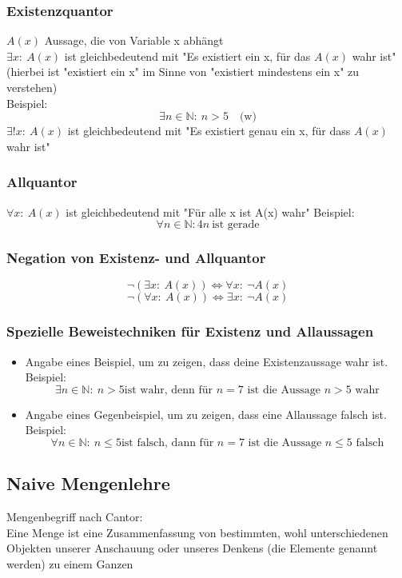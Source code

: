 \documentclass[a4paper]{scrartcl}
\DeclareMathOperator{\Forall}{\forall}
\theoremstyle{definition}
\theoremstyle{plain}
\theoremstyle{plain}
\theoremstyle{remark}
\theoremstyle{remark}
\theoremstyle{remark}
\theoremstyle{remark}
\theoremstyle{remark}
\begin{document}
\subsubsection{Existenzquantor}
\label{sec-2-3-1}
$A(x)$ Aussage, die von Variable x abhängt \\
        $\exists x:~A(x)$ ist gleichbedeutend mit "Es existiert ein x, für das $A(x)$ wahr ist" (hierbei ist "existiert ein x" im Sinne von "existiert mindestens ein x" zu verstehen) \\
        Beispiel:
\[\exists n\in\mathbb{N}:~n>5\quad\text{(w)}\]
$\exists !x:~A(x)$ ist gleichbedeutend mit "Es existiert genau ein x, für dass $A(x)$ wahr ist"
\subsubsection{Allquantor}
\label{sec-2-3-2}
$\Forall x:~A(x)$ ist gleichbedeutend mit "Für alle x ist A(x) wahr"
Beispiel:
\[\Forall n\in\mathbb{N}: 4n~\text{ist gerade}\]
\subsubsection{Negation von Existenz- und Allquantor}
\label{sec-2-3-3}
\[\neg(\exists x:~A(x)) \iff \Forall x:~\neg A(x)\]
\[\neg(\Forall x:~A(x)) \iff \exists x:~\neg A(x)\]
\subsubsection{Spezielle Beweistechniken für Existenz und Allaussagen}
\label{sec-2-3-4}
\begin{itemize}
\item Angabe eines Beispiel, um zu zeigen, dass deine Existenzaussage wahr ist. \\
          Beispiel:
\[\exists n\in\mathbb{N}:~n>5 \text{ist wahr, denn für $n = 7$ ist die Aussage $n > 5$ wahr}\]
\item Angabe eines Gegenbeispiel, um zu zeigen, dass eine Allaussage falsch ist. \\
          Beispiel:
\[\Forall n\in\mathbb{N}:~n\leq 5 \text{ist falsch, dann für $n=7$ ist die Aussage $n\leq 5$ falsch}\]
\end{itemize}
\subsection{Naive Mengenlehre}
\label{sec-2-4}
Mengenbegriff nach Cantor: \\
   Eine Menge ist eine Zusammenfassung von bestimmten, wohl unterschiedenen Objekten unserer Anschauung oder unseres Denkens (die Elemente genannt werden) zu einem Ganzen
\end{document}
